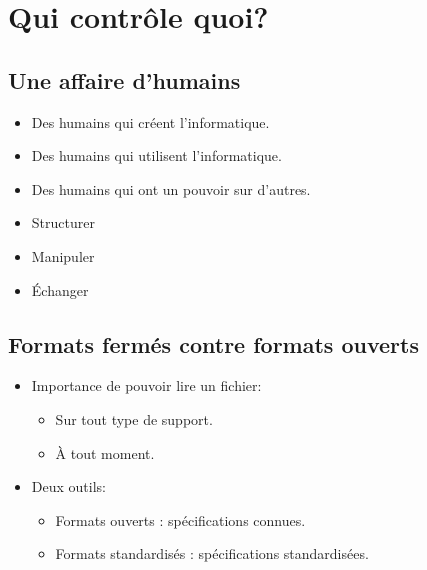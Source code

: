 \section[Contrôler]{Qui contrôle quoi?}

\subsection{Une affaire d'humains}


\begin{slide}
	\begin{itemize}
		\item Des humains qui créent l'informatique.
		\item Des humains qui utilisent l'informatique.
		\item Des humains qui ont un pouvoir sur d'autres.
	\end{itemize}
\end{slide}

\begin{slide}

	
	\begin{itemize}
		\item Structurer
		\item Manipuler
		\item Échanger
	\end{itemize}
	

\end{slide}


\subsection{Formats fermés contre formats ouverts}

\begin{slide}
	\begin{itemize}
	\item Importance de pouvoir lire un fichier:
		\begin{itemize}
			\item Sur tout type de support.
			\item À tout moment.
		\end{itemize}
	\item Deux outils:
		\begin{itemize}
			\item Formats ouverts : spécifications connues.
			\item Formats standardisés : spécifications standardisées.
		\end{itemize}
	\end{itemize}
\end{slide}
